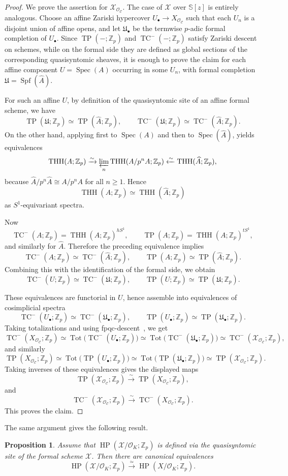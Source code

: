 \documentclass[11pt]{amsart}
\newtheorem{proposition}[lemma]{Proposition}
\numberwithin{equation}{section}
\newcommand{\Z}{\mathbb{Z}}
\newcommand{\sC}{\mathcal{C}}
\newcommand{\sO}{\mathcal{O}}
\newcommand{\sX}{\mathcal{X}}
\newcommand{\mf}{\mathfrak}
\newcommand{\Spec}{\operatorname{Spec}}
\newcommand{\Spf}{\operatorname{Spf}}
\numberwithin{equation}{section}
\newcommand{\TP}{\operatorname{TP}}
\newcommand{\TCn}{\operatorname{TC}^{-}}
\newcommand{\HP}{\operatorname{HP}}
\newcommand{\bS}{\mathbb{S}}
\begin{document}
\begin{proof} We prove the assertion for $\sX_{\sO_{\sC}}$. The case of $\sX$ over $\bS[z]$ is entirely analogous. Choose an affine Zariski hypercover $U_\bullet \to X_{\sO_{\sC}}$ such that each
$U_n$ is a disjoint union of affine opens, and let $\mf{U}_\bullet$ be the termwise
$p$-adic formal completion of $U_\bullet$. Since $\TP(-;\Z_p)$ and
$\TCn(-;\Z_p)$ satisfy Zariski descent on schemes, while on the formal side
they are defined as global sections of the corresponding quasisyntomic sheaves, it is
enough to prove the claim for each affine component
$U = \Spec(A)$ occurring in some $U_n$, with formal completion
$\mf{U} = \Spf(\widehat A)$.

For such an affine $U$, by definition of the quasisyntomic site of an affine formal scheme,
we have
\[
\TP(\mf{U};\Z_p) \simeq \TP(\widehat A;\Z_p),
\qquad
\TCn(\mf{U};\Z_p) \simeq \TCn(\widehat A;\Z_p).
\]
On the other hand, applying \cite[Proposition 4.2]{AMNN22} first to
$\Spec(A)$ and then to $\Spec(\widehat A)$, yields equivalences
\[
\operatorname{THH}(A;\Z_p)
\xrightarrow{\sim}
\varprojlim_n \operatorname{THH}(A/p^nA;\Z_p)
\xleftarrow{\sim}
\operatorname{THH}(\widehat A;\Z_p),
\]
because $\widehat A/p^n\widehat A \cong A/p^nA$ for all $n \ge 1$. Hence
\[
\operatorname{THH}(A;\Z_p)
\simeq
\operatorname{THH}(\widehat A;\Z_p)
\]
as $S^1$-equivariant spectra.

Now
\[
\TCn(A;\Z_p)=\operatorname{THH}(A;\Z_p)^{hS^1},
\qquad
\TP(A;\Z_p)=\operatorname{THH}(A;\Z_p)^{tS^1},
\]
and similarly for $\widehat A$. Therefore the preceding equivalence implies
\[
\TCn(A;\Z_p) \simeq \TCn(\widehat A;\Z_p),
\qquad
\TP(A;\Z_p) \simeq \TP(\widehat A;\Z_p).
\]
Combining this with the identification of the formal side, we obtain
\[
\TCn(U;\Z_p) \simeq \TCn(\mf{U};\Z_p),
\qquad
\TP(U;\Z_p) \simeq \TP(\mf{U};\Z_p).
\]

These equivalences are functorial in $U$, hence assemble into equivalences of cosimplicial spectra
\[
\TCn(U_\bullet;\Z_p) \simeq \TCn(\mf{U}_\bullet;\Z_p),
\qquad
\TP(U_\bullet;\Z_p) \simeq \TP(\mf{U}_\bullet;\Z_p).
\]
Taking totalizations and using fpqc-descent~\cite[Corollary 3.4]{BMS19}, we get
\[
\TCn(X_{\sO_{\sC}};\Z_p)
\simeq
\operatorname{Tot}\bigl(\TCn(U_\bullet;\Z_p)\bigr)
\simeq
\operatorname{Tot}\bigl(\TCn(\mf{U}_\bullet;\Z_p)\bigr)
\simeq
\TCn(\sX_{\sO_{\sC}};\Z_p),
\]
and similarly
\[
  \TP(X_{\sO_{\sC}};\Z_p)
\simeq
\operatorname{Tot}\bigl(\TP(U_\bullet;\Z_p)\bigr)
\simeq
\operatorname{Tot}\bigl(\TP(\mf{U}_\bullet;\Z_p)\bigr)
\simeq
\TP(\sX_{\sO_{\sC}};\Z_p).
\]
Taking inverses of these equivalences gives the displayed maps
\[
\TP(\sX_{\sO_{\sC}};\Z_p)
\xrightarrow{\sim}
\TP(X_{\sO_{\sC}};\Z_p),
\]
and
\[
\TCn(\sX_{\sO_{\sC}};\Z_p)
\xrightarrow{\sim}
\TCn(X_{\sO_{\sC}};\Z_p).
\]
This proves the claim.
\end{proof}
The same argument gives the following result.
\begin{proposition}\label{hpformal}
Assume that $\HP(\sX/\sO_K;\Z_p)$ is defined via the quasisyntomic
site of the formal scheme $\sX$. Then there are canonical equivalences
\[
 \HP(\sX/\sO_K;\Z_p)
\xrightarrow{\simeq}
\HP(X/\sO_K;\Z_p).
\]
\end{proposition}
\end{document}
